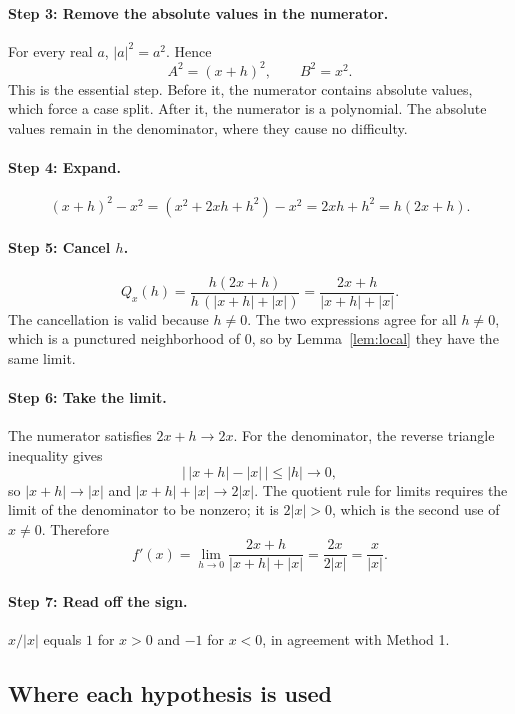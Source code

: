 \documentclass{essay}
\newcommand{\abs}[1]{\lvert #1 \rvert}
\begin{document}
\paragraph{Step 3: Remove the absolute values in the numerator.}
For every real $a$, $\abs{a}^2 = a^2$. Hence
\[
  A^2 = (x+h)^2, \qquad B^2 = x^2.
\]
This is the essential step. Before it, the numerator contains absolute values,
which force a case split. After it, the numerator is a polynomial. The absolute
values remain in the denominator, where they cause no difficulty.

\paragraph{Step 4: Expand.}
\[
  (x+h)^2 - x^2 = (x^2 + 2xh + h^2) - x^2 = 2xh + h^2 = h(2x + h).
\]

\paragraph{Step 5: Cancel $h$.}
\[
  Q_x(h) = \frac{h(2x + h)}{h\,(\abs{x+h} + \abs{x})}
         = \frac{2x + h}{\abs{x+h} + \abs{x}}.
\]
The cancellation is valid because $h \neq 0$. The two expressions agree for all
$h \neq 0$, which is a punctured neighborhood of $0$, so by
Lemma~\ref{lem:local} they have the same limit.

\paragraph{Step 6: Take the limit.}
The numerator satisfies $2x + h \to 2x$. For the denominator, the reverse
triangle inequality gives
\[
  \bigl\lvert\, \abs{x+h} - \abs{x} \,\bigr\rvert \leq \abs{h} \to 0,
\]
so $\abs{x+h} \to \abs{x}$ and $\abs{x+h} + \abs{x} \to 2\abs{x}$. The quotient
rule for limits requires the limit of the denominator to be nonzero; it is
$2\abs{x} > 0$, which is the second use of $x \neq 0$. Therefore
\[
  f'(x) = \lim_{h \to 0} \frac{2x + h}{\abs{x+h} + \abs{x}}
        = \frac{2x}{2\abs{x}} = \frac{x}{\abs{x}}.
\]

\paragraph{Step 7: Read off the sign.}
$x / \abs{x}$ equals $1$ for $x > 0$ and $-1$ for $x < 0$, in agreement with
Method 1.

\subsection{Where each hypothesis is used}
\end{document}
